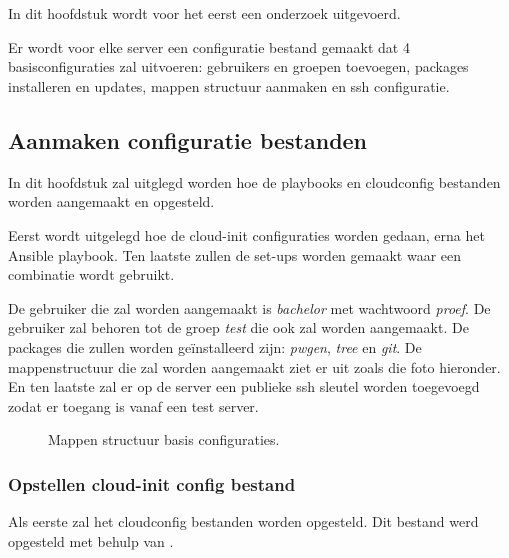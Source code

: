 \chapter{}
\label{ch:basisconf}
In dit hoofdstuk wordt voor het eerst een onderzoek uitgevoerd. 

Er wordt voor elke server een configuratie bestand gemaakt dat 4 basisconfiguraties zal uitvoeren: gebruikers en groepen toevoegen, packages installeren en updates, mappen structuur aanmaken en ssh configuratie. 


\section{Aanmaken configuratie bestanden}
In dit hoofdstuk zal uitglegd worden hoe de playbooks en cloudconfig bestanden worden aangemaakt en opgesteld. 

Eerst wordt uitgelegd hoe de cloud-init configuraties worden gedaan, erna het Ansible playbook. Ten laatste zullen de set-ups worden gemaakt waar een combinatie wordt gebruikt.

De gebruiker die zal worden aangemaakt is \textit{bachelor} met wachtwoord \textit{proef}. De gebruiker zal behoren tot de groep \textit{test} die ook zal worden aangemaakt. De packages die zullen worden geïnstalleerd zijn: \textit{pwgen}, \textit{tree} en \textit{git}. De mappenstructuur die zal worden aangemaakt ziet er uit zoals die foto hieronder. En ten laatste zal er op de server een publieke ssh sleutel worden toegevoegd zodat er toegang is vanaf een test server.

\begin{figure}[!htb]
	\caption{Mappen structuur basis configuraties.}
	\label{fig:mappen}
\end{figure}
\subsection{Opstellen cloud-init config bestand}
Als eerste zal het cloudconfig bestanden worden opgesteld. Dit bestand werd opgesteld met behulp van \autocite{clouddocs}.

